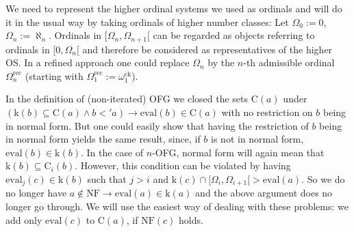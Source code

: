 \documentclass[10pt]{article}
\def\ar{\rightarrow}
\def\k{\mathrm{k}}
\def\eval{\mathrm{eval}}
\def\C{\mathrm{C}}
\def\NF{\mathrm{NF}}
\def\ck{\mathrm{ck}}
\def\rec{\mathrm{rec}}
\begin{document}
We need to represent the higher ordinal systems we used as ordinals and
will do it in the usual way by taking ordinals of higher number classes:
Let $\Omega_0:= 0$,
$\Omega_n:= \aleph_n$. Ordinals in $[\Omega_n,\Omega_{n+1}[$ can be
regarded as objects referring to ordinals in $[0,\Omega_n[$ and therefore
be considered as representatives of the higher OS. In a refined approach 
one could replace $\Omega_n$ by the $n$-th admissible ordinal $\Omega_n^\rec$
(starting with $\Omega_1^\rec:= \omega_1^\ck$).\par  
In the definition of (non-iterated) OFG we closed the sets $\C(a)$ under
$(\k(b) \subseteq \C(a) \land b <' a )\ar \eval(b) \in \C(a)$ with no
restriction on $b$ being in normal form. But one could easily show that
having the restriction of $b$ being in normal form yields the same result,
since, if $b$ is not in normal form, $\eval(b) \in \k(b)$. In the case 
of $n$-OFG, normal form will again mean that $\k(b) \subseteq \C_i(b)$.
However, this condition can be violated by having $\eval_j(c) \in \k(b)$
such that $j>i$ and $\k(c) \cap [\Omega_i,\Omega_{i+1}[> \eval(a)$.
So we do no longer have $a \notin \NF  \ar \eval(a) \in \k(a)$ and the
above argument does no longer go through. We will use the 
easiest way of dealing with these problems: we add only
 $\eval(c)$ to $\C(a)$, if $\NF(c)$ holds.
%
%
%
%
%
\end{document}
